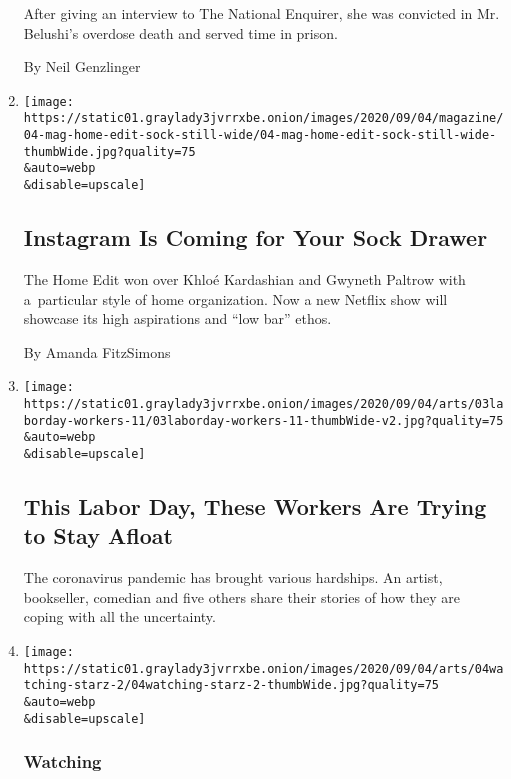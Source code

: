 \begin{enumerate}
  After giving an interview to The National Enquirer, she was convicted
  in Mr. Belushi's overdose death and served time in prison.

  By Neil Genzlinger
\item
  \href{/2020/09/04/magazine/instagram-is-coming-for-your-sock-drawer.html}{}

  \texttt{[image: https://static01.graylady3jvrrxbe.onion/images/2020/09/04/magazine/04-mag-home-edit-sock-still-wide/04-mag-home-edit-sock-still-wide-thumbWide.jpg?quality=75\\\&auto=webp\\\&disable=upscale]}

  \hypertarget{instagram-is-coming-for-your-sock-drawer}{%
  \subsection{Instagram Is Coming for Your Sock
  Drawer}\label{instagram-is-coming-for-your-sock-drawer}}

  The Home Edit won over Khloé Kardashian and Gwyneth Paltrow with
  a~particular style of home organization. Now a new Netflix show will
  showcase its high aspirations and ``low bar'' ethos.

  By Amanda FitzSimons
\item
  \href{/2020/09/04/arts/labor-day-workers-arts-coronavirus.html}{}

  \texttt{[image: https://static01.graylady3jvrrxbe.onion/images/2020/09/04/arts/03laborday-workers-11/03laborday-workers-11-thumbWide-v2.jpg?quality=75\\\&auto=webp\\\&disable=upscale]}

  \hypertarget{this-labor-day-these-workers-are-trying-to-stay-afloat}{%
  \subsection{This Labor Day, These Workers Are Trying to Stay
  Afloat}\label{this-labor-day-these-workers-are-trying-to-stay-afloat}}

  The coronavirus pandemic has brought various hardships. An artist,
  bookseller, comedian and five others share their stories of how they
  are coping with all the uncertainty.
\item
  \href{/2020/09/03/arts/television/power-ghost-boys-away.html}{}

  \texttt{[image: https://static01.graylady3jvrrxbe.onion/images/2020/09/04/arts/04watching-starz-2/04watching-starz-2-thumbWide.jpg?quality=75\\\&auto=webp\\\&disable=upscale]}

  \hypertarget{watching}{%
  \subsubsection{Watching}\label{watching}}


\end{enumerate}
